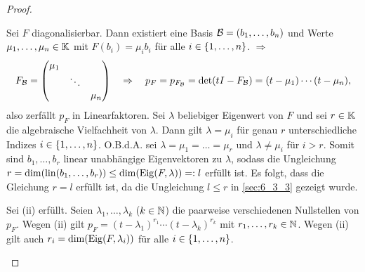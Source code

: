 \begin{proof}\
	\begin{description}[font=\normalfont]
		\item[(i)$ \Rightarrow $(ii):]
			Sei $ F $ diagonalisierbar. Dann existiert eine Basis $ \mathcal{B} = (b_1, \ldots, b_n) $ und Werte $ \mu_1, \ldots, \mu_n \in \mathbb K $ mit $ F(b_i) = \mu_ib_i $ für alle $ i \in \{ 1,\ldots,n \} $. $ \Rightarrow $
			\begin{equation*}
				F_{\mathcal{B}} = \begin{pmatrix}
					\mu_1 && \\
					& \ddots & \\
					&& \mu_n
				\end{pmatrix}
				\quad\Rightarrow\quad
				p_F = p_{F_{\mathcal{B}}} = \det(tI - F_{\mathcal{B}}) = (t-\mu_1) \cdots (t-\mu_n),
			\end{equation*}
			also zerfällt $ p_F $ in Linearfaktoren. Sei $ \lambda $ beliebiger Eigenwert von $ F $ und sei $ r \in \mathbb K $ die algebraische Vielfachheit von $ \lambda $. Dann gilt $ \lambda = \mu_i $ für genau $ r $ unterschiedliche Indizes $ i \in \{ 1,\ldots,n \} $. O.B.d.A. sei $ \lambda = \mu_1 = \ldots = \mu_r $ und $ \lambda \neq \mu_i $ für $ i > r $. Somit sind $ b_1, \ldots, b_r $ linear unabhängige Eigenvektoren zu $ \lambda $, sodass die Ungleichung $ r = \dim(\operatorname{lin}(b_1, \ldots, b_r)) \leq \dim(\operatorname{Eig}(F,\lambda)) =: l $ erfüllt ist. Es folgt, dass die Gleichung $ r = l $ erfüllt ist, da die Ungleichung $ l \leq r $ in \ref*{sec:6_3_3} gezeigt wurde.
		\item[(ii)$ \Rightarrow $(iii):]
			Sei (ii) erfüllt. Seien $ \lambda_1, \ldots, \lambda_k $ ($ k \in \mathbb N $) die paarweise verschiedenen Nullstellen von $ p_F $. Wegen (ii) gilt $ p_F = (t-\lambda_1)^{r_1} \cdots (t-\lambda_k)^{r_k} $ mit $ r_1, \ldots, r_k \in \mathbb N $. Wegen (ii) gilt auch $ r_i = \dim(\operatorname{Eig}(F,\lambda_i)) $ für alle $ i \in \{ 1,\ldots,n \} $.
			

\end{description}
\end{proof}
